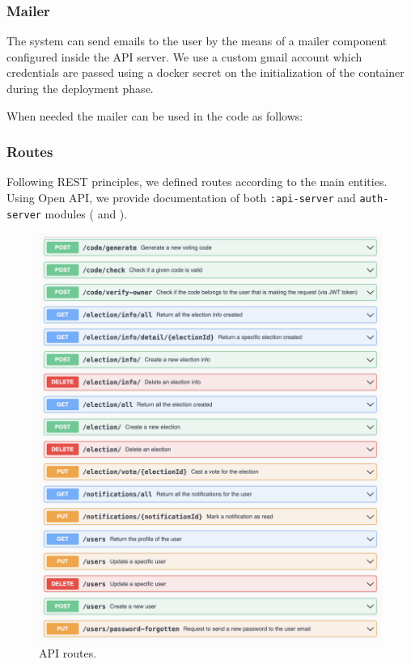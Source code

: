 \documentclass{scrartcl}
\begin{document}
\subsubsection{Mailer}
The system can send emails to the user by the means of a mailer component configured inside the API server. 
We use a custom gmail account which credentials are passed using a docker secret on the initialization of the container during the deployment phase.

When needed the mailer can be used in the code as follows:



\subsubsection{Routes}

Following REST principles, we defined routes according to the main entities.
Using Open API, we provide documentation of both \texttt{:api-server} and \texttt{auth-server} modules ( and ).


\begin{figure}
    \centering
    \includegraphics[width=\textwidth]{./figures/backend-routes/api.png}
    \caption{API routes.}
    \label{fig:backend-routes-api}
\end{figure}
\end{document}
